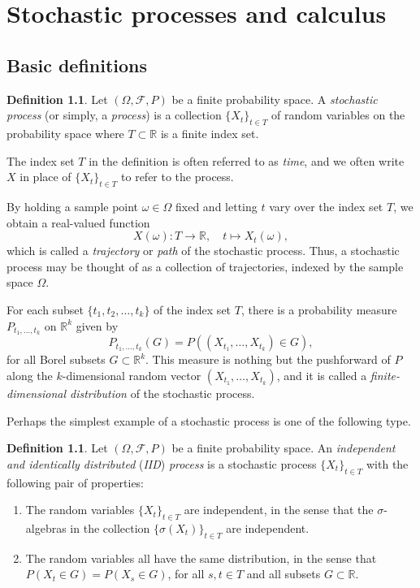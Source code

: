 \documentclass[11pt]{book}
\theoremstyle{definition}
\newtheorem{defn}[thm]{Definition}
\numberwithin{equation}{section}
\begin{document}
\chapter{Stochastic processes and calculus}

\section{Basic definitions}

\begin{defn}
	Let $(\Omega, \mathcal{F}, P)$ be a finite probability space. A \textit{stochastic process} (or simply, a \textit{process}) is a collection $\{X_t\}_{t\in T}$ of random variables on the probability space where $T\subset \mathbb{R}$ is a finite index set.
\end{defn}

The index set $T$ in the definition is often referred to as \textit{time}, and we often write $X$ in place of $\{X_t\}_{t\in T}$ to refer to the process.

By holding a sample point $\omega\in \Omega$ fixed and letting $t$ vary over the index set $T$, we obtain a real-valued function
\[
	X(\omega):T \to \mathbb{R}, \quad t\mapsto X_t(\omega),
\]
which is called a \textit{trajectory} or \textit{path} of the stochastic process. Thus, a stochastic process may be thought of as a collection of trajectories, indexed by the sample space $\Omega$.

For each subset $\{t_1,t_2,\ldots,t_k\}$ of the index set $T$, there is a probability measure $P_{t_1,\ldots,t_k}$ on $\mathbb{R}^k$ given by
\[
	P_{t_1,\ldots,t_k}(G) = P\left( (X_{t_1},\ldots,X_{t_k}) \in G \right),
\]
for all Borel subsets $G\subset \mathbb{R}^k$. This measure is nothing but the pushforward of $P$ along the $k$-dimensional random vector $(X_{t_1},\ldots,X_{t_k})$, and it is called a \textit{finite-dimensional distribution} of the stochastic process.

Perhaps the simplest example of a stochastic process is one of the following type.

\begin{defn}
	Let $(\Omega, \mathcal{F}, P)$ be a finite probability space. An \textit{independent and identically distributed} (\textit{IID}) \textit{process} is a stochastic process $\{X_t\}_{t\in T}$ with the following pair of properties:
	\begin{enumerate}
		\item The random variables $\{X_t\}_{t\in T}$ are independent, in the sense that the $\sigma$-algebras in the collection $\{\sigma(X_t)\}_{t\in T}$ are independent.
		\item The random variables all have the same distribution, in the sense that $P(X_t\in G) = P(X_s\in G)$, for all $s,t\in T$ and all subsets $G\subset \mathbb{R}$.
	\end{enumerate}
\end{defn}
\end{document}
